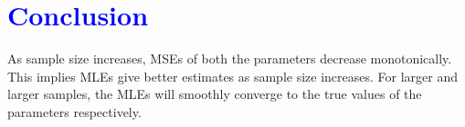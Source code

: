 \documentclass[11pt, a4paper]{article}\usepackage[]{graphicx}\usepackage[]{xcolor}
\begin{document}
\section*{\faArrowAltCircleRight[regular] \textcolor{blue}{Conclusion}}

\smallpencil \hspace{0.3cm} {\setlength{\spaceskip}{1em plus 0.5em minus 0.5em} \fontsize{17}{20}\myfont As sample size increases, MSEs of both the parameters decrease monotonically. This implies MLEs give better estimates as sample size increases. For larger and larger samples, the MLEs will smoothly converge to the true values of the parameters respectively. \par}
\end{document}
